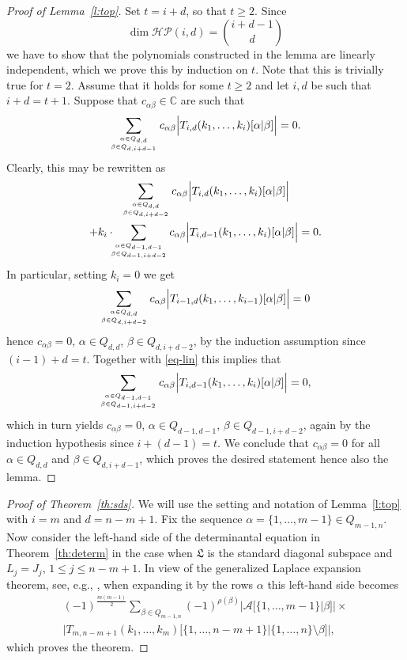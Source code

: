 \documentclass[10pt,twoside,a4paper,reqno]{amsart}
\theoremstyle{plain}
\theoremstyle{definition}
\theoremstyle{remark}
\begin{document}
\begin{proof}[Proof of Lemma~\ref{l:top}]
Set $t=i+d$, so that $t\ge 2$. Since
$$\dim {\mathcal{HP}}(i,d)=\binom{i+d-1}{d}$$
we have to show that the polynomials constructed in the lemma are linearly independent, which we prove this by induction on $t$. Note that this is trivially true for $t=2$. Assume that it holds for some $t\ge 2$ and let $i,d$ be such that $i+d=t+1$. Suppose that $c_{{\alpha}{\beta}}\in{\mathbb {C}}$ are such that
$$\sum_{{\alpha}\in Q_{d,d}\atop {\beta}\in Q_{d,i+d-1}}c_{{\alpha}{\beta}}\Big|T_{i,d}(k_1,\ldots,k_i)[{\alpha}|{\beta}]\Big|=0.$$
Clearly, this may be rewritten as
\begin{multline}\label{eq-lin}
\sum_{{\alpha}\in Q_{d,d}\atop {\beta}\in Q_{d,i+d-2}}c_{{\alpha}{\beta}}\Big|T_{i,d}(k_1,\ldots,k_i)[{\alpha}|{\beta}]\Big|\\
+k_i\cdot\!\!\!\sum_{{\alpha}\in Q_{d-1,d-1}\atop {\beta}\in Q_{d-1,i+d-2}}c_{{\alpha}{\beta}}\Big|T_{i,d-1}(k_1,\ldots,k_i)[{\alpha}|{\beta}]\Big|=0.
\end{multline}
In particular, setting $k_i=0$ we get
$$\sum_{{\alpha}\in Q_{d,d}\atop {\beta}\in Q_{d,i+d-2}}c_{{\alpha}{\beta}}\Big|T_{i-1,d}(k_1,\ldots,k_{i-1})[{\alpha}|{\beta}]\Big|=0$$
hence
$c_{{\alpha}{\beta}}=0$, ${\alpha}\in Q_{d,d}$, ${\beta}\in Q_{d,i+d-2}$,
by the induction assumption since $(i-1)+d=t$. Together with \eqref{eq-lin} this implies that
$$\sum_{{\alpha}\in Q_{d-1,d-1}\atop {\beta}\in Q_{d-1,i+d-2}}c_{{\alpha}{\beta}}\Big|T_{i,d-1}(k_1,\ldots,k_i)[{\alpha}|{\beta}]\Big|=0,$$
which in turn yields $c_{{\alpha}{\beta}}=0$, ${\alpha}\in Q_{d-1,d-1}$, ${\beta}\in Q_{d-1,i+d-2}$, again by the induction hypothesis since $i+(d-1)=t$. We conclude that
$c_{{\alpha}{\beta}}=0$ for all ${\alpha}\in Q_{d,d}$ and ${\beta}\in Q_{d,i+d-1}$, which proves the desired statement hence also the lemma.
\end{proof}

\begin{proof}[Proof of Theorem~\ref{th:sds}]
We will use the setting and notation of Lemma~\ref{l:top} with $i=m$ and $d=n-m+1$. Fix the sequence ${\alpha}=\{1,\ldots,m-1\}\in Q_{m-1,n}$. Now consider the left-hand side of the determinantal equation in
Theorem~\ref{th:determ} in the case when ${\mathfrak L}$ is the standard diagonal subspace and $L_j=J_j$, $1\le j\le n-m+1$. In view of the generalized Laplace expansion theorem, see, e.g., \cite[\S 2.4.11]{MM}, when expanding it by the rows ${\alpha}$ this left-hand side becomes
\begin{multline*}
(-1)^{\frac{m(m-1)}{2}}\sum_{{\beta}\in Q_{m-1,n}}(-1)^{\rho({\beta})}\Big|{\mathcal A}\big[\{1,\ldots,m-1\}|{\beta}\big]\Big|\times\\
\Big|T_{m,n-m+1}(k_1,\ldots,k_m)\big[\{1,\ldots,n-m+1\}|\{1,\ldots,n\}\setminus{\beta}\big]\Big|,
\end{multline*}
which proves the theorem.
\end{proof}
\end{document}
